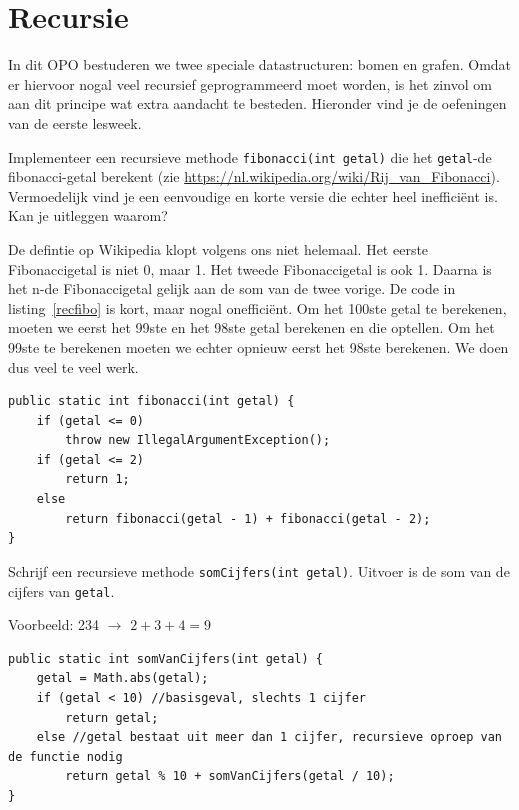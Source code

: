 \chapter{Recursie}
In dit OPO bestuderen we twee speciale datastructuren: bomen en grafen. Omdat er hiervoor nogal veel recursief geprogrammeerd moet worden, is het zinvol om aan dit principe wat extra aandacht te besteden. Hieronder vind je de oefeningen van de eerste lesweek.
\begin{oef}
\code Implementeer een recursieve methode \verb/fibonacci(int getal)/ die het \verb/getal/-de fibonacci-getal berekent (zie \url{https://nl.wikipedia.org/wiki/Rij_van_Fibonacci}). Vermoedelijk vind je een eenvoudige en korte versie die echter heel inefficiënt is. Kan je uitleggen waarom? 
\begin{opl}
De defintie op Wikipedia klopt volgens ons niet helemaal. Het eerste Fibonaccigetal is niet 0, maar 1. Het tweede Fibonaccigetal is ook 1. Daarna is het n-de Fibonaccigetal gelijk aan de som van de twee vorige. De code in listing~\ref{recfibo} is kort, maar nogal onefficiënt. Om het 100ste getal te berekenen, moeten we eerst het 99ste en het 98ste getal berekenen en die optellen. Om het 99ste te berekenen moeten we echter opnieuw eerst het 98ste berekenen. We doen dus veel te veel werk.
\begin{lstlisting}[caption={Recursieve methode om Fibonacci-getallen te berekenen}, label=recfibo]
public static int fibonacci(int getal) {
	if (getal <= 0)
		throw new IllegalArgumentException();
	if (getal <= 2)
		return 1;
	else
		return fibonacci(getal - 1) + fibonacci(getal - 2);
}
\end{lstlisting}
\end{opl}

\end{oef}

\begin{oef}
\code Schrijf een recursieve methode \verb/somCijfers(int getal)/. Uitvoer is de som van de cijfers van \verb/getal/. 

Voorbeeld: 234 $\rightarrow$ $2+3+4=9$
\begin{opl}
\begin{lstlisting}[caption={Recursieve methode om de som van de cijfers van een getal te berekenen}, label=recsomgetallen]
public static int somVanCijfers(int getal) {
	getal = Math.abs(getal);
	if (getal < 10) //basisgeval, slechts 1 cijfer
		return getal;
	else //getal bestaat uit meer dan 1 cijfer, recursieve oproep van de functie nodig
		return getal % 10 + somVanCijfers(getal / 10);
}
\end{lstlisting}
\end{opl}

\end{oef}




